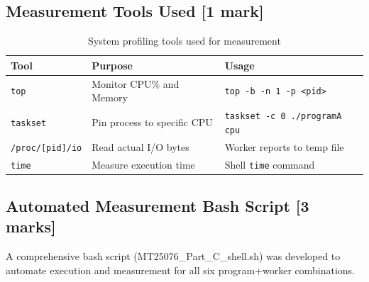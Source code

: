 \documentclass[12pt,a4paper]{article}
\begin{document}
\subsection{Measurement Tools Used [1 mark]}

\begin{table}[H]
\centering
\begin{tabular}{lll}
\toprule
\textbf{Tool} & \textbf{Purpose} & \textbf{Usage} \\
\midrule
\texttt{top} & Monitor CPU\% and Memory & \texttt{top -b -n 1 -p <pid>} \\
\texttt{taskset} & Pin process to specific CPU & \texttt{taskset -c 0 ./programA cpu} \\
\texttt{/proc/[pid]/io} & Read actual I/O bytes & Worker reports to temp file \\
\texttt{time} & Measure execution time & Shell \texttt{time} command \\
\bottomrule
\end{tabular}
\caption{System profiling tools used for measurement}
\label{tab:tools}
\end{table}

\subsection{Automated Measurement Bash Script [3 marks]}

A comprehensive bash script (MT25076\_Part\_C\_shell.sh) was developed to automate 
execution and measurement for all six program+worker combinations.
\end{document}
